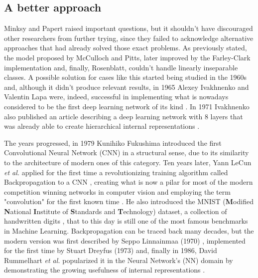 \documentclass[a4paper, 12pt]{report}
\begin{document}
\subsection{A better approach}
Minksy and Papert raised important questions, but it shouldn't have discouraged other researchers from further trying, since they failed to acknowledge alternative approaches that had already solved those exact problems. As previously stated, the model proposed by McCulloch and Pitts, later improved by the Farley-Clark implementation and, finally, Rosenblatt, couldn't handle linearly inseparable classes. A possible solution for cases like this started being studied in the 1960s \autocite{josephContributionsPerceptronTheory1960,rosenblattPrinciplesNeurodynamicsPerceptrons1962} and, although it didn't produce relevant results, in 1965 Alexey Ivakhnenko and Valentin Lapa \autocite{ivakhnenkoCyberneticPredictingDevices} were, indeed, successful in implementing what is nowadays considered to be the first deep learning network of its kind \autocite{schmidhuberDeepLearningNeural2015}. In 1971 Ivakhnenko also published an article describing a deep learning network with 8 layers that was already able to create hierarchical internal representations \autocite{4308320}.
\par The years progressed, in 1979 Kunihiko Fukushima introduced the first Convolutional Neural Network (CNN) in a structural sense, due to its similarity to the architecture of modern ones of this category. Ten years later, Yann LeCun \textit{et al.} applied for the first time a revolutionizing training algorithm called Backpropagation to a CNN \autocite{6795724}, creating what is now a pilar for most of the modern competition winning networks in computer vision \autocite{schmidhuberDeepLearningNeural2015} and employing the term "convolution" for the first known time \autocite{liSurveyConvolutionalNeural2020}. He also introduced the MNIST (\textbf{M}odified \textbf{N}ational \textbf{I}nstitute of \textbf{S}tandards and \textbf{T}echnology) dataset, a collection of handwritten digits \autocite{lecunGradientBasedLearningApplied1998}, that to this day is still one of the most famous benchmarks in Machine Learning. Backpropagation can be traced back many decades, but the modern version was first described by Seppo Linnainmaa (1970) \autocite{linnainmaa1970representation}, implemented for the first time by Stuart Dreyfus (1973) \autocite{Dreyfus1973383} and, finally in 1986, David Rummelhart \textit{et al.} popularized it in the Neural Network's (NN) domain by demonstrating the growing usefulness of internal representations \autocite{rumelhart1986learning}.
\end{document}
